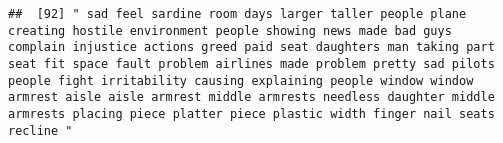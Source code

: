 \documentclass[
]{article}
\begin{document}
\begin{verbatim}
##  [92] " sad feel sardine room days larger taller people plane creating hostile environment people showing news made bad guys complain injustice actions greed paid seat daughters man taking part seat fit space fault problem airlines made problem pretty sad pilots people fight irritability causing explaining people window window armrest aisle aisle armrest middle armrests needless daughter middle armrests placing piece platter piece plastic width finger nail seats recline "                                                                                                                                                                                                                                                                                                                                                                                                                                                                                                                                                                                                                                                                                                                                                                                                                                                                                                                                                                                                                                                                                                                                                                                                                                                                                                          

\end{verbatim}
\end{document}
